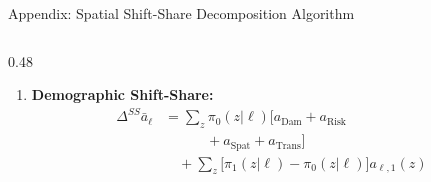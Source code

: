 \documentclass[aspectratio=169, 10pt]{beamer}
\begin{document}
\begin{frame}{Appendix: Spatial Shift-Share Decomposition Algorithm \hfill \hyperlink{main:mechanisms}{\scriptsize{}}}
\begin{columns}[T]
\begin{column}{0.48\textwidth}
\begin{enumerate}
                {\tiny
                \begin{align*}
                a_{\text{Spat}} &= (I - \tilde{T}_0)^{-1}\Delta s - a_{\text{Dam}} - a_{\text{Risk}} \\
                a_{\text{Trans}} &= a_1 - (I - \tilde{T}_0)^{-1}s_1
                \end{align*}
                }
                \item \textbf{Demographic Shift-Share:}
                {\tiny
                \begin{align*}
                \Delta^{SS}\bar{a}_\ell &= \sum_z \pi_0(z|\ell)\bigl[a_{\text{Dam}} + a_{\text{Risk}} \\
                &\qquad\quad + a_{\text{Spat}} + a_{\text{Trans}}\bigr] \\
                &\quad + \sum_z \bigl[\pi_1(z|\ell) - \pi_0(z|\ell)\bigr] a_{\ell,1}(z)
                \end{align*}
                }
            \end{enumerate}
        \end{column}
    \end{columns}
\end{frame}
\end{document}
